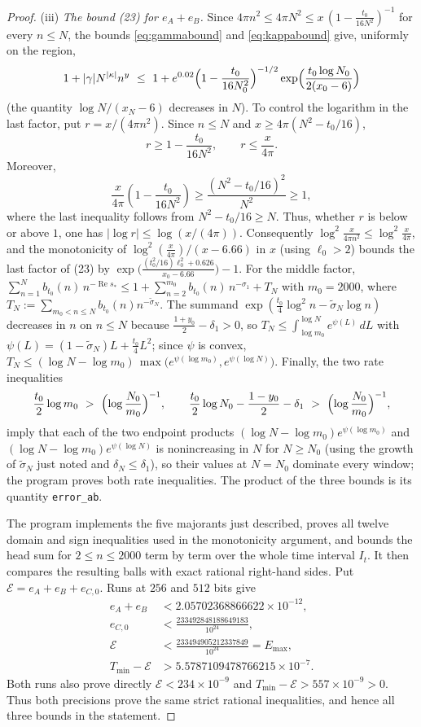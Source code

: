 \documentclass[11pt]{article}
\theoremstyle{definition}
\DeclareMathOperator{\Rea}{Re}
\begin{document}
\begin{proof}
(iii) \emph{The bound (23) for $e_A+e_B$.} Since
$4\pi n^2\le4\pi N^2\le x\,(1-\frac{t_0}{16N^2})^{-1}$ for every
$n\le N$, the bounds \eqref{eq:gammabound} and \eqref{eq:kappabound}
give, uniformly on the region,
\[
1+|\gamma|N^{|\kappa|}n^y\ \le\
1+e^{0.02}\Bigl(1-\frac{t_0}{16N_0^2}\Bigr)^{-1/2}
\exp\Bigl(\frac{t_0\log N_0}{2(x_0-6)}\Bigr)
\]
(the quantity $\log N/(x_N-6)$ decreases in $N$).  To control the
logarithm in the last factor, put $r=x/(4\pi n^2)$.  Since $n\le N$ and
$x\ge4\pi(N^2-t_0/16)$,
\[
r\ge1-\frac{t_0}{16N^2},\qquad r\le\frac{x}{4\pi}.
\]
Moreover,
\[
\frac{x}{4\pi}\left(1-\frac{t_0}{16N^2}\right)
\ge \frac{(N^2-t_0/16)^2}{N^2}\ge1,
\]
where the last inequality follows from $N^2-t_0/16\ge N$.  Thus, whether
$r$ is below or above $1$, one has
$|\log r|\le\log(x/(4\pi))$.  Consequently
$\log^2\frac{x}{4\pi n^2}\le\log^2\frac x{4\pi}$, and
the monotonicity of $\log^2(\frac x{4\pi})/(x-6.66)$ in $x$
(using $\ell_0>2$) bounds the last factor of (23) by
$\exp\bigl(\frac{(t_0^2/16)\ell_0^2+0.626}{x_0-6.66}\bigr)-1$. For
the middle factor, $\sum_{n=1}^{N}b_{t_0}(n)\,n^{-\Rea s_*}\le
1+\sum_{n=2}^{m_0}b_{t_0}(n)\,n^{-\sigma_1}+T_N$ with $m_0=2000$,
where
$T_N:=\sum_{m_0<n\le N}b_{t_0}(n)n^{-\widetilde\sigma_N}$.
The summand
$\exp(\frac{t_0}4\log^2n-\widetilde\sigma_N\log n)$ decreases in $n$ on
$n\le N$ because $\frac{1+y_0}2-\delta_1>0$, so
$T_N\le\int_{\log m_0}^{\log N}e^{\psi(L)}\,dL$ with
$\psi(L)=(1-\widetilde\sigma_N)L+\frac{t_0}4L^2$; since $\psi$ is convex,
$T_N\le(\log N-\log m_0)\,
\max\bigl(e^{\psi(\log m_0)},e^{\psi(\log N)}\bigr)$. Finally, the
two rate inequalities
\[
\frac{t_0}2\log m_0\ >\ \Bigl(\log\frac{N_0}{m_0}\Bigr)^{-1},
\qquad
\frac{t_0}2\log N_0-\frac{1-y_0}2-\delta_1\ >\
\Bigl(\log\frac{N_0}{m_0}\Bigr)^{-1},
\]
imply that each of the two endpoint products
$(\log N-\log m_0)e^{\psi(\log m_0)}$ and
$(\log N-\log m_0)e^{\psi(\log N)}$ is nonincreasing in $N$ for
$N\ge N_0$ (using the growth of $\widetilde\sigma_N$ just noted
and $\delta_N\le\delta_1$), so their values at $N=N_0$
dominate every window; the program proves both rate inequalities. The
product of the three bounds is its quantity \texttt{error\_ab}.

The program implements the five majorants just described, proves all twelve
domain and sign inequalities used in the monotonicity argument, and bounds the
head sum for $2\le n\le2000$ term by term over the whole time interval $I_t$.
It then compares the resulting balls with exact rational
right-hand sides.  Put $\mathcal E=e_A+e_B+e_{C,0}$.  Runs at $256$ and
$512$ bits give
\[
\begin{aligned}
e_A+e_B&<2.05702368866622\times10^{-12},\\
e_{C,0}&<\frac{233492848188649183}{10^{24}},\\
\mathcal E&<\frac{233494905212337849}{10^{24}}=E_{\max},\\
T_{\min}-\mathcal E&>5.5787109478766215\times10^{-7}.
\end{aligned}
\]
Both runs also prove directly
$\mathcal E<234\times10^{-9}$ and
$T_{\min}-\mathcal E>557\times10^{-9}>0$.  Thus both precisions prove the
same strict rational inequalities, and hence all three bounds in the
statement.
\end{proof}
\end{document}
